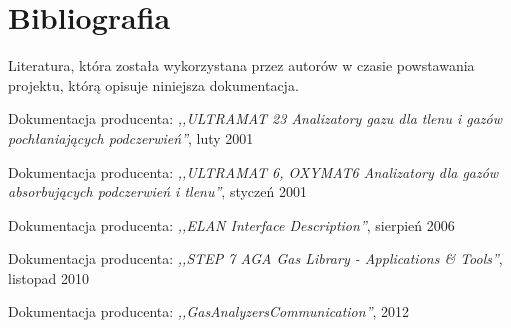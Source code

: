 \section{Bibliografia}
Literatura, która została wykorzystana przez autorów w czasie powstawania projektu, którą opisuje niniejsza dokumentacja.

\begin{thebibliography}{9}
Dokumentacja producenta: 
\emph{,,ULTRAMAT 23 Analizatory gazu dla tlenu i gazów pochłaniających podczerwień''}, 
luty 2001

Dokumentacja producenta: 
\emph{,,ULTRAMAT 6, OXYMAT6 Analizatory dla gazów absorbujących podczerwień i tlenu''}, 
styczeń 2001

Dokumentacja producenta: 
\emph{,,ELAN Interface Description''}, 
sierpień 2006

Dokumentacja producenta: 
\emph{,,STEP 7 AGA Gas Library - Applications \& Tools''}, 
listopad 2010

Dokumentacja producenta: 
\emph{,,GasAnalyzersCommunication''}, 
2012

\end{thebibliography}